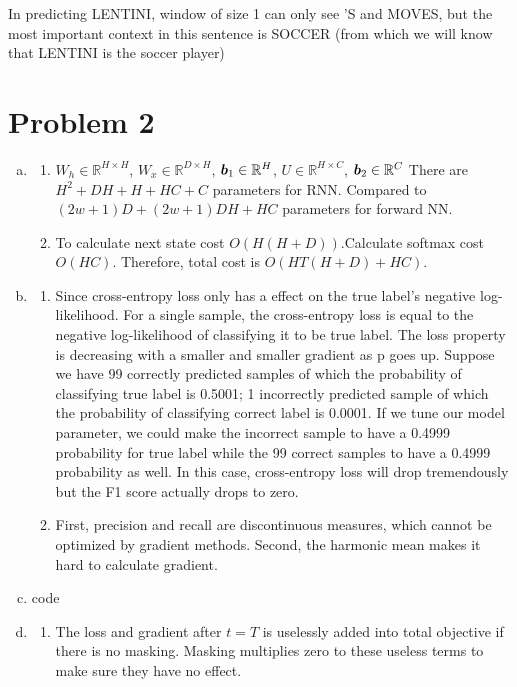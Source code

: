 \documentclass[11pt, oneside]{article}      %
\newcommand{\bb}{\mbox{\boldmath $b$}}
\newcommand{\real}[1]{\mbox{$\mathbb{R}^{#1}$}}
\newcommand{\hasPageBreak}{}
\begin{document}
\begin{enumerate}   [(a)]
\begin{enumerate}   [i]
In predicting LENTINI, window of size 1 can only see 'S and MOVES, but the most important context in this sentence is SOCCER (from which we will know that LENTINI is the soccer player)



\end{enumerate}



\end{enumerate}







\hasPageBreak
\section*{Problem 2}
\begin{enumerate}   [(a)]

\item 
\begin{enumerate}   [i]
\item $W_h \in \real{H \times H}$, 
		$W_x \in \real{D \times H}$, 
		$\bb_1 \in \real{H}$, 
		$U \in \real{H \times C}$, 
		$\bb_2 \in \real{C}$
There are $H^2+DH+H+HC+C$ parameters for RNN.
Compared to $(2w+1)D+(2w+1)DH+HC$ parameters for forward NN.
\item To calculate next state cost $O(H(H+D))$.Calculate softmax cost $O(HC)$. Therefore, total cost is $O(HT(H+D)+HC)$.
\end{enumerate}

\item
\begin{enumerate}   [i]
\item Since cross-entropy loss only has a effect on the true label's negative log-likelihood. For a single sample, the cross-entropy loss is equal to the negative log-likelihood of classifying it to be true label. The loss property is decreasing with a smaller and smaller gradient as p goes up. Suppose we have 99 correctly predicted samples of which the probability of classifying true label is 0.5001; 1 incorrectly predicted sample of which the probability of classifying correct label is 0.0001. If we tune our model parameter, we could make the incorrect sample to have a 0.4999 probability for true label while the 99 correct samples to have a 0.4999 probability as well. In this case, cross-entropy loss will drop tremendously but the F1 score actually drops to zero.
\item First, precision and recall are discontinuous measures, which cannot be optimized by gradient methods. Second, the harmonic mean makes it hard to calculate gradient.
\end{enumerate}
\item code
\item 
\begin{enumerate}   [i]
\item The loss and gradient after $t=T$ is uselessly added into total objective if there is no masking. Masking multiplies zero to these useless terms to make sure they have no effect.
\end{enumerate}


\end{enumerate}
\end{document}

